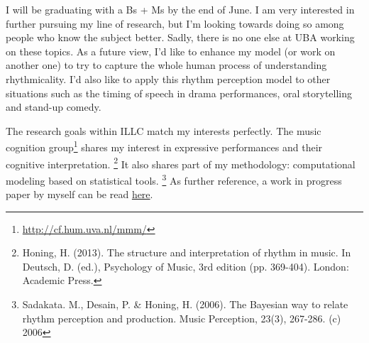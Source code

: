 \documentclass[a4paper]{letter}
\begin{document}
\begin{letter}{}


I will be graduating with a Bs + Ms by the end of June. I am very interested 
in further pursuing my line of research, but I'm looking towards doing so among
people who know the subject better. Sadly, there is no one else at UBA working
on these topics. As a future view, I'd like to enhance my model (or work on
another one) to try to capture the whole human process of understanding
rhythmicality. I'd also like to apply this rhythm perception model to other
situations such as the timing of speech in drama performances, oral
storytelling and stand-up comedy.

The research goals within ILLC match my interests perfectly. The
music cognition group\footnote{\url{http://cf.hum.uva.nl/mmm/}} shares my
interest in expressive performances and their cognitive interpretation.%
\footnote{Honing, H. (2013).  The structure and interpretation of rhythm in
music. In Deutsch, D. (ed.), Psychology of Music, 3rd edition (pp.
369-404). London: Academic Press.} It also shares part of my methodology:
computational modeling based on statistical tools.%
\footnote{Sadakata. M., Desain, P. \& Honing, H. (2006). The Bayesian way
to relate rhythm perception and production. Music Perception, 23(3), 267-286.
(c) 2006} As further reference, a work in progress paper by myself can be
read \href{
https://drive.google.com/file/d/0BzNsqva23xUGal9Bdl8xYWJOeHM/view?usp=sharing}%
{here}.


\end{letter}
\end{document}
